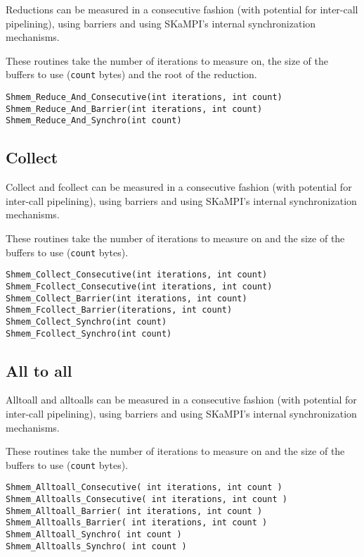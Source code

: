 \documentclass[12pt, letterpaper]{article}
\begin{document}
Reductions can be measured in a consecutive fashion (with potential for inter-call pipelining), using barriers and using SKaMPI's internal synchronization mechanisms. 
	 
 These routines take the number of iterations to measure on, the size of the buffers to use ({\tt count} bytes) and the root of the reduction.

\begin{lstlisting}
Shmem_Reduce_And_Consecutive(int iterations, int count)
Shmem_Reduce_And_Barrier(int iterations, int count)
Shmem_Reduce_And_Synchro(int count)
\end{lstlisting}

\subsection{Collect}

Collect and fcollect can be measured in a consecutive fashion (with potential for inter-call pipelining), using barriers and using SKaMPI's internal synchronization mechanisms. 

 These routines take the number of iterations to measure on and the size of the buffers to use ({\tt count} bytes).

\begin{lstlisting}
Shmem_Collect_Consecutive(int iterations, int count)
Shmem_Fcollect_Consecutive(int iterations, int count)
Shmem_Collect_Barrier(int iterations, int count)
Shmem_Fcollect_Barrier(iterations, int count)
Shmem_Collect_Synchro(int count)
Shmem_Fcollect_Synchro(int count)
\end{lstlisting}

\subsection{All to all}

Alltoall and alltoalls can be measured in a consecutive fashion (with potential for inter-call pipelining), using barriers and using SKaMPI's internal synchronization mechanisms. 

 These routines take the number of iterations to measure on and the size of the buffers to use ({\tt count} bytes).

\begin{lstlisting}
Shmem_Alltoall_Consecutive( int iterations, int count )
Shmem_Alltoalls_Consecutive( int iterations, int count )
Shmem_Alltoall_Barrier( int iterations, int count )
Shmem_Alltoalls_Barrier( int iterations, int count )
Shmem_Alltoall_Synchro( int count )
Shmem_Alltoalls_Synchro( int count )
\end{lstlisting}
\end{document}

